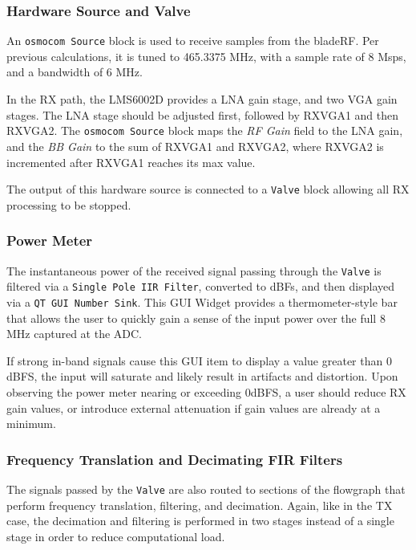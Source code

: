 \subsubsection{Hardware Source and Valve}

An \texttt{osmocom Source} block is used to receive samples from the bladeRF.
Per previous calculations, it is tuned to 465.3375 MHz, with a sample rate
of 8 Msps, and a bandwidth of 6 MHz.

In the \ac{RX} path, the LMS6002D provides a \ac{LNA} gain stage, and two
\ac{VGA} gain stages. The \ac{LNA} stage should be adjusted first, followed by
RXVGA1 and then RXVGA2. The \texttt{osmocom Source} block maps the \textit{RF
Gain} field to the \ac{LNA} gain, and the \textit{BB Gain} to the sum of RXVGA1
and RXVGA2, where RXVGA2 is incremented after RXVGA1 reaches its max value.

The output of this hardware source is connected to a \texttt{Valve} block
allowing all \ac{RX} processing to be stopped.

\subsubsection{Power Meter}
The instantaneous power of the received signal passing through the \texttt{Valve} is
filtered via a \texttt{Single Pole IIR Filter}, converted to dBFs, and then
displayed via a \texttt{QT GUI Number Sink}. This \ac{GUI} Widget provides a
thermometer-style bar that allows the user to quickly gain a sense of the input
power over the full 8 MHz captured at the ADC.

If strong in-band signals cause this \ac{GUI} item to display a value
greater than 0 dBFS, the input will saturate and likely result in artifacts
and distortion. Upon observing the power meter nearing or exceeding 0dBFS, a
user should reduce \ac{RX} gain values, or introduce external attenuation if
gain values are already at a minimum.

\subsubsection{Frequency Translation and Decimating FIR Filters}
The signals passed by the \texttt{Valve} are also routed to sections of
the flowgraph that perform frequency translation, filtering, and decimation.
Again, like in the \ac{TX} case, the decimation and filtering is performed
in two stages instead of a single stage in order to reduce computational load.

